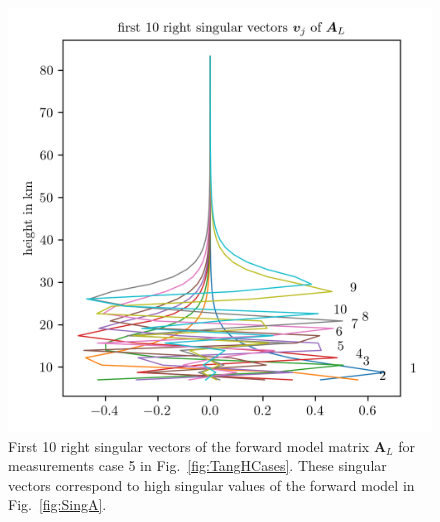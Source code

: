 \begin{figure}[ht!]
	\centering
	\includegraphics{SingVecA.png}
	\caption[First 10 right singular vectors of forward model.]{First 10 right singular vectors of the forward model matrix $\bm{A}_L$ for measurements case 5 in Fig.~\ref{fig:TangHCases}. These singular vectors correspond to high singular values of the forward model in Fig.~\ref{fig:SingA}.}
	\label{fig:SingVecA}
\end{figure}
